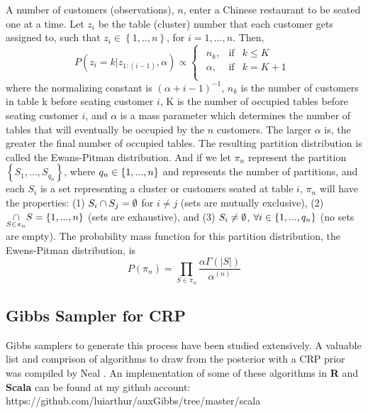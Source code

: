 \noindent
A number of customers (observations), $n$, enter a Chinese restaurant to be
seated one at a time. Let $z_i$ be the table (cluster) number that each
customer gets assigned to, such that $z_i \in \left\{ 1,..,n \right\}$, for
$i = 1,...,n$. Then,
\begin{equation}
  P(z_i=k|z_{1:(i-1)},\alpha) \propto 
  \begin{cases}
    \begin{array}{rll}
      n_k,    & \text{if} & k \le K\\
      \alpha, & \text{if} & k = K+1\\
    \end{array}
  \end{cases}
\end{equation}
where the normalizing constant is ${(\alpha+i-1)}^{-1}$, $n_k$ is the number of
customers in table k before seating customer $i$, K is the number of occupied
tables before seating customer $i$, and $\alpha$ is a mass parameter which
determines the number of tables that will eventually be occupied by the $n$
customers. The larger $\alpha$ is, the greater the final number of occupied
tables. The resulting partition distribution is called the Ewans-Pitman
distribution. And if we let $\pi_n$ represent the partition
$\left\{S_1,...,S_{q_n}\right\}$, where $q_n \in \left \{1,...,n\right \}$ and represents
the number of partitions, and each $S_i$ is a set representing a cluster or
customers seated at table $i$, $\pi_n$ will have the properties: (1) $S_i \cap
S_j = \emptyset$ for $i \ne j$ (sets are mutually exclusive), (2) $\underset{S \in
\pi_n}{\cap} S = \left \{ 1,...,n \right \}$ (sets are exhaustive), and (3) $S_i \ne \emptyset$,
$\forall i \in \left \{ 1,...,q_n\right \}$ (no sets are empty).  The probability mass
function for this partition distribution, the Ewens-Pitman distribution, is
\begin{equation}
  P(\pi_n) = \underset{S \in \pi_n}{\prod} 
             \frac{\alpha\Gamma(|S|)}{\alpha^{(n)}}
\end{equation}

\subsection{Gibbs Sampler for CRP}
Gibbs samplers to generate this process have been studied extensively.  A
valuable list and comprison of algorithms to draw from the posterior with a CRP
prior was compiled by Neal \citep{neal}. An implementation of some of these
algorithms in \textbf{R} and \textbf{Scala} can be found at my github account:
https://github.com/luiarthur/auxGibbs/tree/master/scala\\

